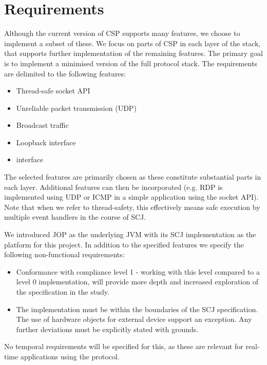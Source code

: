 \section{Requirements}
Although the current version of CSP supports many features, we choose to implement a subset of these. We focus on parts of CSP in each layer of the stack, that supports further implementation of the remaining features. The primary goal is to implement a minimised version of the full protocol stack. The requirements are delimited to the following features:

\begin{itemize}
	\item Thread-safe socket API
	\item Unreliable packet transmission (UDP)
	\item Broadcast traffic
	\item Loopback interface
	\item \iic interface
\end{itemize}

The selected features are primarily chosen as these constitute substantial parts in each layer. Additional features can then be incorporated (e.g. RDP is implemented using UDP or ICMP in a simple application using the socket API).
Note that when we refer to thread-safety, this effectively means safe execution by multiple event handlers in the course of SCJ.

We introduced JOP as the underlying JVM with its SCJ implementation as the platform for this project. In addition to the specified features we specify the following non-functional requirements:

\begin{itemize}
	\item Conformance with compliance level 1 - working with this level compared to a level 0 implementation, will provide more depth and increased exploration of the specification in the study.
	\item The implementation must be within the boundaries of the SCJ specification. The use of hardware objects for external device support an exception. Any further deviations must be explicitly stated with grounds.
\end{itemize}

No temporal requirements will be specified for this, as these are relevant for real-time applications using the protocol.